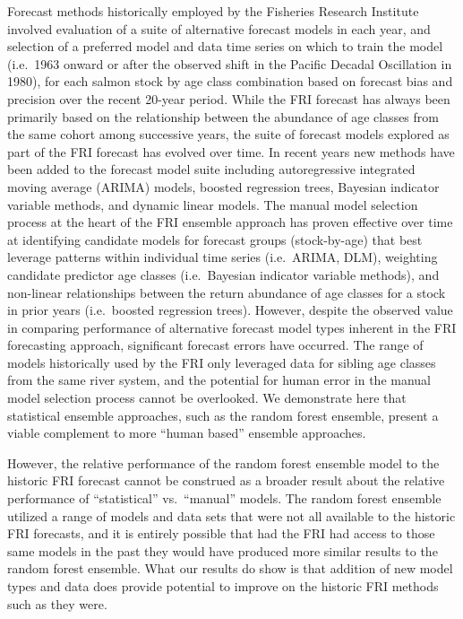 \documentclass[
]{article}
\begin{document}
Forecast methods historically employed by the Fisheries Research Institute involved evaluation of a suite of alternative forecast models in each year, and selection of a preferred model and data time series on which to train the model (i.e.~1963 onward or after the observed shift in the Pacific Decadal Oscillation in 1980), for each salmon stock by age class combination based on forecast bias and precision over the recent 20-year period. While the FRI forecast has always been primarily based on the relationship between the abundance of age classes from the same cohort among successive years, the suite of forecast models explored as part of the FRI forecast has evolved over time. In recent years new methods have been added to the forecast model suite including autoregressive integrated moving average (ARIMA) models, boosted regression trees, Bayesian indicator variable methods, and dynamic linear models. The manual model selection process at the heart of the FRI ensemble approach has proven effective over time at identifying candidate models for forecast groups (stock-by-age) that best leverage patterns within individual time series (i.e.~ARIMA, DLM), weighting candidate predictor age classes (i.e.~Bayesian indicator variable methods), and non-linear relationships between the return abundance of age classes for a stock in prior years (i.e.~boosted regression trees). However, despite the observed value in comparing performance of alternative forecast model types inherent in the FRI forecasting approach, significant forecast errors have occurred. The range of models historically used by the FRI only leveraged data for sibling age classes from the same river system, and the potential for human error in the manual model selection process cannot be overlooked. We demonstrate here that statistical ensemble approaches, such as the random forest ensemble, present a viable complement to more ``human based'' ensemble approaches.

However, the relative performance of the random forest ensemble model to the historic FRI forecast cannot be construed as a broader result about the relative performance of ``statistical'' vs.~``manual'' models. The random forest ensemble utilized a range of models and data sets that were not all available to the historic FRI forecasts, and it is entirely possible that had the FRI had access to those same models in the past they would have produced more similar results to the random forest ensemble. What our results do show is that addition of new model types and data does provide potential to improve on the historic FRI methods such as they were.
\end{document}
